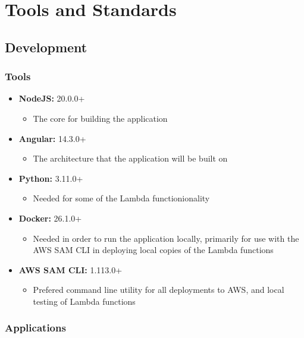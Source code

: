 \documentclass[12pt]{article}
\begin{document}
\section{Tools and Standards}

\subsection{Development}
\subsubsection{Tools}

\begin{itemize}
    \item \textbf{NodeJS:} 20.0.0+
          \begin{itemize}
              \item The core for building the application
          \end{itemize}
    \item \textbf{Angular:} 14.3.0+
          \begin{itemize}
              \item The architecture that the application will be built on
          \end{itemize}
    \item \textbf{Python:} 3.11.0+
          \begin{itemize}
              \item Needed for some of the Lambda functionionality
          \end{itemize}
    \item \textbf{Docker:} 26.1.0+
          \begin{itemize}
              \item Needed in order to run the application locally, primarily for use with the AWS SAM CLI in deploying local copies of the Lambda functions
          \end{itemize}
    \item \textbf{AWS SAM CLI:} 1.113.0+
          \begin{itemize}
              \item Prefered command line utility for all deployments to AWS, and local testing of Lambda functions
          \end{itemize}
\end{itemize}

\subsubsection{Applications}
\end{document}

